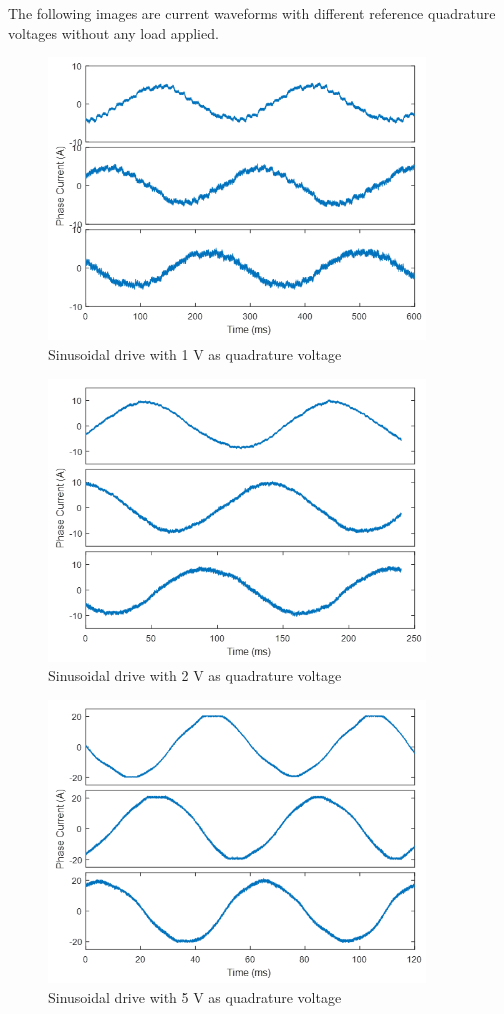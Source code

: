 The following images are current waveforms with different reference quadrature voltages without any load applied.

\begin{figure}[h!p]
\centering
\includegraphics[width=10cm]{Images/waveforms/sin1.png} 
\caption[sin1]{Sinusoidal drive with 1 V as quadrature voltage}
\label{fig:sin1}
\end{figure}

\begin{figure}[h!p]
\centering
\includegraphics[width=10cm]{Images/waveforms/sin2.png} 
\caption[sin2]{Sinusoidal drive with 2 V as quadrature voltage}
\label{fig:sin2}
\end{figure}

\begin{figure}[h!p]
\centering
\includegraphics[width=10cm]{Images/waveforms/sin3.png} 
\caption[sin3]{Sinusoidal drive with 5 V as quadrature voltage}
\label{fig:sin3}
\end{figure}

